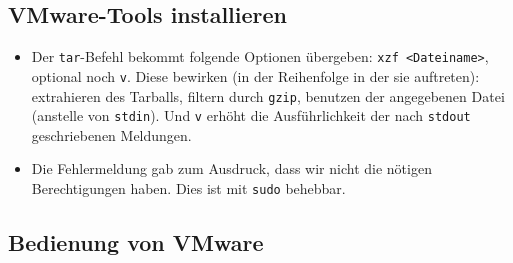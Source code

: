 \documentclass[12pt,a4paper]{article}
\begin{document}
\subsection{VMware-Tools installieren}
\begin{itemize}
    \item Der \texttt{tar}-Befehl bekommt folgende Optionen übergeben:
        \texttt{xzf <Dateiname>}, optional noch \texttt{v}. Diese bewirken
        (in der Reihenfolge in der sie auftreten): extrahieren des Tarballs,
        filtern durch \texttt{gzip}, benutzen der angegebenen Datei
        (anstelle von \texttt{stdin}). Und \texttt{v} erhöht die Ausführlichkeit
        der nach \texttt{stdout} geschriebenen Meldungen.
    \item Die Fehlermeldung gab zum Ausdruck, dass wir nicht die nötigen Berechtigungen
        haben. Dies ist mit \texttt{sudo} behebbar.
\end{itemize}
\subsection{Bedienung von VMware}
\end{document}
